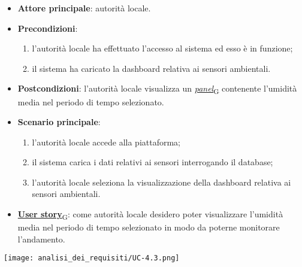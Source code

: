 \begin{itemize}
	\item \textbf{Attore principale}: autorità locale.
	\item \textbf{Precondizioni}:
	      \begin{enumerate}
		      \item l'autorità locale ha effettuato l'accesso al sistema ed esso è in funzione;
		      \item il sistema ha caricato la dashboard relativa ai sensori ambientali.
	      \end{enumerate}
	\item \textbf{Postcondizioni}: l'autorità locale visualizza un \href{https://7last.github.io/docs/pb/documentazione-interna/glossario\#panel}{\textit{panel}\textsubscript{G}} contenente l'umidità media nel periodo di tempo selezionato.
	\item \textbf{Scenario principale}:
	      \begin{enumerate}
		      \item l'autorità locale accede alla piattaforma;
		      \item il sistema carica i dati relativi ai sensori interrogando il database;
		      \item l'autorità locale seleziona la visualizzazione della dashboard relativa ai sensori ambientali.
	      \end{enumerate}
	\item \href{https://7last.github.io/docs/pb/documentazione-interna/glossario\#user-story}{\textbf{User story}\textsubscript{G}}: come autorità locale desidero poter visualizzare l'umidità media nel periodo di tempo selezionato
	      in modo da poterne monitorare l'andamento.
\end{itemize}
\begin{center}
	\texttt{[image: analisi\_dei\_requisiti/UC-4.3.png]}
\end{center}



